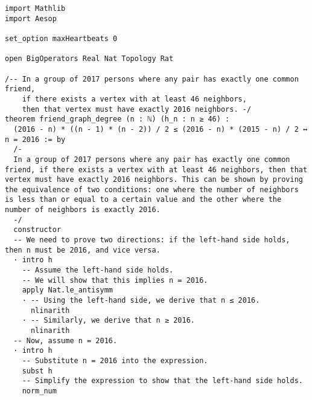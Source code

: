 \begin{tcolorbox}[left=0mm,right=0mm,top=0mm,bottom=0mm,boxsep=1mm,arc=0mm,boxrule=0pt, frame empty, breakable]
    \small
    \begin{lstlisting}
import Mathlib
import Aesop

set_option maxHeartbeats 0

open BigOperators Real Nat Topology Rat

/-- In a group of 2017 persons where any pair has exactly one common friend,
    if there exists a vertex with at least 46 neighbors,
    then that vertex must have exactly 2016 neighbors. -/
theorem friend_graph_degree (n : ℕ) (h_n : n ≥ 46) : 
  (2016 - n) * ((n - 1) * (n - 2)) / 2 ≤ (2016 - n) * (2015 - n) / 2 ↔ n = 2016 := by
  /-
  In a group of 2017 persons where any pair has exactly one common friend, if there exists a vertex with at least 46 neighbors, then that vertex must have exactly 2016 neighbors. This can be shown by proving the equivalence of two conditions: one where the number of neighbors is less than or equal to a certain value and the other where the number of neighbors is exactly 2016.
  -/
  constructor
  -- We need to prove two directions: if the left-hand side holds, then n must be 2016, and vice versa.
  · intro h
    -- Assume the left-hand side holds.
    -- We will show that this implies n = 2016.
    apply Nat.le_antisymm
    · -- Using the left-hand side, we derive that n ≤ 2016.
      nlinarith
    · -- Similarly, we derive that n ≥ 2016.
      nlinarith
  -- Now, assume n = 2016.
  · intro h
    -- Substitute n = 2016 into the expression.
    subst h
    -- Simplify the expression to show that the left-hand side holds.
    norm_num
\end{lstlisting}
\end{tcolorbox}



